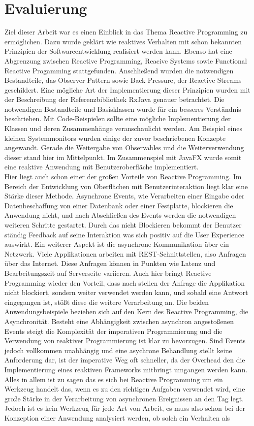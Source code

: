 \chapter{Evaluierung}\label{eval}
Ziel dieser Arbeit war es einen Einblick in das Thema Reactive Programming zu ermöglichen. Dazu wurde geklärt wie reaktives Verhalten mit schon bekannten Prinzipien der Softwareentwicklung realisiert werden kann. Ebenso hat eine Abgrenzung zwischen Reactive Programming, Reacive Systems sowie Functional Reactive Progamming stattgefunden. Anschließend wurden die notwendigen Bestandteile, das Observer Pattern sowie Back Pressure, der Reactive Streams geschildert. Eine mögliche Art der Implementierung dieser Prinzipien wurden mit der Beschreibung der Referenzbibliothek RxJava genauer betrachtet. Die notwendigen Bestandteile und Basisklassen wurde für ein besseres Verständnis beschrieben. Mit Code-Beispielen sollte eine mögliche Implementierung der Klassen und deren Zusammenhänge veranschaulicht werden. Am Beispiel eines kleinen Systemmonitors wurden einige der zuvor beschriebenen Konzepte angewandt. Gerade die Weitergabe von Observables und die Weiterverwendung dieser stand hier im Mittelpunkt. Im Zusammenspiel mit JavaFX wurde somit eine reaktive Anwendung mit Benutzeroberfläche implementiert. \\ Hier liegt auch schon einer der großen Vorteile von Reactive Programming. Im Bereich der Entwicklung von Oberflächen mit Benutzerinteraktion liegt klar eine Stärke dieser Methode. Asynchrone Events, wie Verarbeiten einer Eingabe oder Datenbeschaffung von einer Datenbank oder einer Festplatte, blockieren die Anwendung nicht, und nach Abschließen des Events werden die notwendigen weiteren Schritte gestartet. Durch das nicht Blockieren bekommt der Benutzer ständig Feedback auf seine Interaktion was sich positiv auf die User Experience auswirkt. Ein weiterer Aspekt ist die asynchrone Kommunikation über ein Netzwerk. Viele Applikationen arbeiten mit REST-Schnittstellen, also Anfragen über das Internet. Diese Anfragen können in Punkten wie Latenz und Bearbeitungszeit auf Serverseite variieren. Auch hier bringt Reactive Programming wieder den Vorteil, dass nach stellen der Anfrage die Applikation nicht blockiert, sondern weiter verwendet werden kann, und sobald eine Antwort eingegangen ist, stößt diese die weitere Verarbeitung an. Die beiden Anwendungsbeispiele beziehen sich auf den Kern des Reactive Programming, die Asynchronität. Besteht eine Abhängigkeit zwischen asynchron angestoßenen Events steigt die Komplexität der imperativen Programmierung und die Verwendung von reaktiver Programmierung ist klar zu bevorzugen. Sind Events jedoch vollkommen unabhängig und eine asychrone Behandlung stellt keine Anforderung dar, ist der imperative Weg oft schneller, da der Overhead den die Implementierung eines reaktiven Frameworks mitbringt umgangen werden kann. Alles in allem ist zu sagen das es sich bei Reactive Programming um ein Werkzeug handelt das, wenn es zu den richtigen Aufgaben verwendet wird, eine große Stärke in der Verarbeitung von asynchronen Ereignissen an den Tag legt. Jedoch ist es kein Werkzeug für jede Art von Arbeit, es muss also schon bei der Konzeption einer Anwendung analysiert werden, ob solch ein Verhalten als 